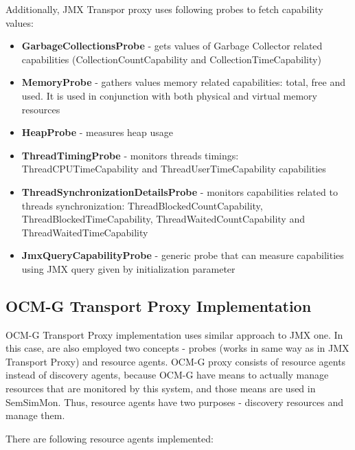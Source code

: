 Additionally, JMX Transpor proxy uses following probes to fetch capability values: 
\begin{itemize} 
  \item{\bf{GarbageCollectionsProbe}} - gets values of Garbage Collector related capabilities (CollectionCountCapability and CollectionTimeCapability)
  \item{\bf{MemoryProbe}} - gathers values memory related capabilities: total, free and used. It is used in conjunction with both physical and virtual memory resources
  \item{\bf{HeapProbe}} - measures heap usage  
  \item{\bf{ThreadTimingProbe}} - monitors threads timings: ThreadCPUTimeCapability and ThreadUserTimeCapability capabilities
  \item{\bf{ThreadSynchronizationDetailsProbe}} - monitors capabilities related to threads synchronization: ThreadBlockedCountCapability, ThreadBlockedTimeCapability, ThreadWaitedCountCapability and ThreadWaitedTimeCapability
  \item{\bf{JmxQueryCapabilityProbe}} - generic probe that can measure capabilities using JMX query given by initialization parameter
\end{itemize} 

\subsection{OCM-G Transport Proxy Implementation}

OCM-G Transport Proxy implementation uses similar approach to JMX one. In this case, are also employed two concepts - probes (works in same way as in JMX Transport Proxy) and resource agents. OCM-G proxy consists of resource agents instead of discovery agents, because OCM-G have means to actually manage resources that are monitored by this system, and those means are used in SemSimMon. Thus, resource agents have two purposes - discovery resources and manage them.

There are following resource agents implemented:

